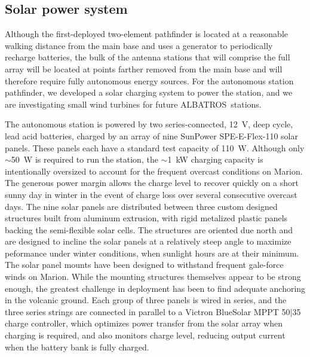 \documentclass{ws-jai}
\def\albatros{ALBATROS}
\begin{document}
\subsection{Solar power system}

Although the first-deployed two-element pathfinder is located at a
reasonable walking distance from the main base and uses a generator to
periodically recharge batteries, the bulk of the antenna stations that
will comprise the full array will be located at points farther removed
from the main base and will therefore require fully autonomous energy
sources.  For the autonomous station pathfinder, we developed a solar
charging system to power the station, and we are investigating small
wind turbines for future \albatros\ stations.

The autonomous station is powered by two series-connected, 12~V, deep
cycle, lead acid batteries, charged by an array of nine SunPower
SPE-E-Flex-110 solar panels. These panels each have a standard test
capacity of 110~W. Although only $\sim$50~W is required to run the
station, the $\sim$1~kW charging capacity is intentionally oversized
to account for the frequent overcast conditions on Marion.  The
generous power margin allows the charge level to recover quickly on a
short sunny day in winter in the event of charge loss over several
consecutive overcast days.  The nine solar panels are distributed
between three custom designed structures built from aluminum
extrusion, with rigid metalized plastic panels backing the
semi-flexible solar cells. The structures are oriented due north and
are designed to incline the solar panels at a relatively steep angle
to maximize peformance under winter conditions, when sunlight hours
are at their minimum. The solar panel mounts have been designed to
withstand frequent gale-force winds on Marion. While the mounting
structures themselves appear to be strong enough, the greatest
challenge in deployment has been to find adequate anchoring in the
volcanic ground.  Each group of three panels is wired in series, and
the three series strings are connected in parallel to a Victron
BlueSolar MPPT 50$\vert$35 charge controller, which optimizes power
transfer from the solar array when charging is required, and also
monitors charge level, reducing output current when the battery bank
is fully charged.
\end{document}
